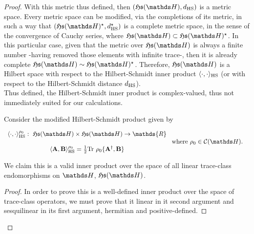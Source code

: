 \documentclass{homework}
\begin{document}
\begin{proof}
With this metric thus defined, then $(\mathfrak{H}\mathfrak{s}(\hilbert), d_{\textnormal{HS}})$ is a metric space. Every metric space can be modified, via the completions of its metric, in such a way that 
$(\mathfrak{H}\mathfrak{s}(\hilbert)^{\star}, d_{\textnormal{HS}}^{\star})$ is a complete metric space, in the sense of the convergence of Cauchy series, where $\mathfrak{H}\mathfrak{s}(\hilbert) \subset \mathfrak{H}\mathfrak{s}(\hilbert)^{\star}$. In this particular case, given that the metric over $\mathfrak{H}\mathfrak{s}(\hilbert)$ is always a finite number -having removed those elements with infinite trace-, then it is already complete $\mathfrak{H}\mathfrak{s}(\hilbert) \sim \mathfrak{H}\mathfrak{s}(\hilbert)^{\star}$. Therefore, $\mathfrak{H}\mathfrak{s}(\hilbert)$ is a Hilbert space with respect to the Hilbert-Schmidt inner product $\langle \cdot , \cdot \rangle_{\textnormal{HS}}$ (or with respect to the Hilbert-Schmidt distance $d_{\textnormal{HS}}$). \\

Thus defined, the Hilbert-Schmidt inner product is complex-valued, thus not immediately suited for our calculations.

\begin{theo}
Consider the modified Hilbert-Schmidt product given by 
 
 \begin{align*}
 \begin{array}{c}
    \langle \cdot , \cdot \rangle_{\textnormal{HS}}^{\rho_0}: \blanky \mathfrak{H}\mathfrak{s}(\hilbert) \times \mathfrak{H}\mathfrak{s}(\hilbert) \rightarrow \mathds{R} \\
    \\
    \langle {\bf A}, {\bf B} \rangle_{\textnormal{HS}}^{\rho_0} = \frac{1}{2}\textnormal{Tr } \rho_0 \bf \{A^\dagger, {\bf B}\}
 \end{array} & \textnormal{ where } \rho_0 \in \statespace.
\end{align*}

We claim this is a valid inner product over the space of all linear trace-class endomorphisms on $\hilbert$, $\mathfrak{H}\mathfrak{s}(\hilbert)$.
\end{theo}

\begin{proof}

In order to prove this is a well-defined inner product over the space of trace-class operators, we must prove that it linear in it second argument and sesquilinear in its first argument, hermitian and positive-defined. 


\end{proof}
\end{proof}
\end{document}
